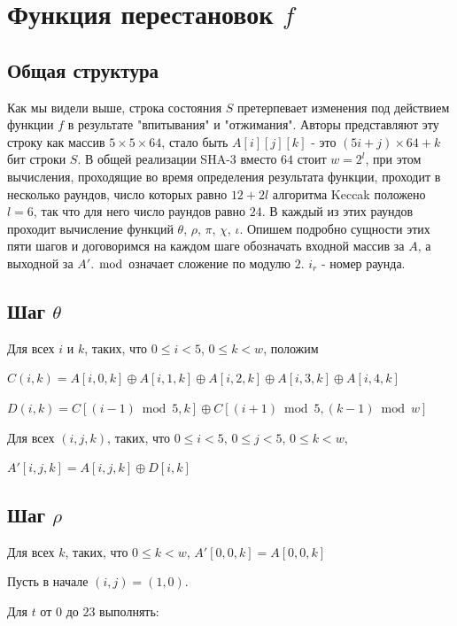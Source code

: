 \documentclass[a4paper,12pt]{article}
\theoremstyle{plain} %
\theoremstyle{definition} %
\theoremstyle{remark} %
\begin{document}
	\section{Функция перестановок $f$}
	\subsection{Общая структура}
	
	Как мы видели выше, строка состояния $S$ претерпевает изменения под действием функции $f$ в результате "впитывания" и "отжимания". Авторы представляют эту строку как массив $5 \times 5 \times 64$, стало быть $A[i][j][k]$ - это  $(5i+j)\times 64 + k$ бит строки $S$. В общей реализации SHA-3 вместо $64$ стоит $w = 2^l$, при этом вычисления, проходящие во время определения результата функции, проходит в несколько раундов, число которых равно $12+2l$ алгоритма Keccak положено $l = 6$, так что для него число раундов равно $24$. В каждый из этих раундов проходит вычисление функций $\theta$, $\rho$, $\pi$, $\chi$, $\iota$. Опишем подробно сущности этих пяти шагов и договоримся на каждом шаге обозначать входной массив за $A$, а выходной за $A'$. $\bmod$ означает сложение по модулю $2$. $i_r$ - номер раунда.
	
	\subsection{Шаг $\theta$}
	
	Для всех $i$ и $k$, таких, что $0 \leqslant i < 5$, $0 \leqslant k < w$, положим
	
	$C(i, k) = A[i, 0, k] \oplus A[i, 1, k] \oplus A[i, 2, k] \oplus A[i, 3, k] \oplus A[i, 4, k]$ 
	
	$D(i, k) = C[(i-1) \bmod 5, k] \oplus C[(i+1) \bmod 5, (k-1) \bmod w]$
	
	Для всех $(i, j, k)$, таких, что $0 \leqslant i < 5$, $0 \leqslant j < 5$, $0 \leqslant k < w$, 
	
	$A'[i, j,k] = A[i, j, k] \oplus D[i, k]$ 
	
	\subsection{Шаг $\rho$}
	
	Для всех $k$, таких, что $0 \leqslant k < w$, $A'[0,0,k] = A[0,0,k]$
	
	Пусть в начале $(i, j) = (1, 0)$. 
	
	Для $t$ от $0$ до $23$ выполнять:
	
\end{document}
